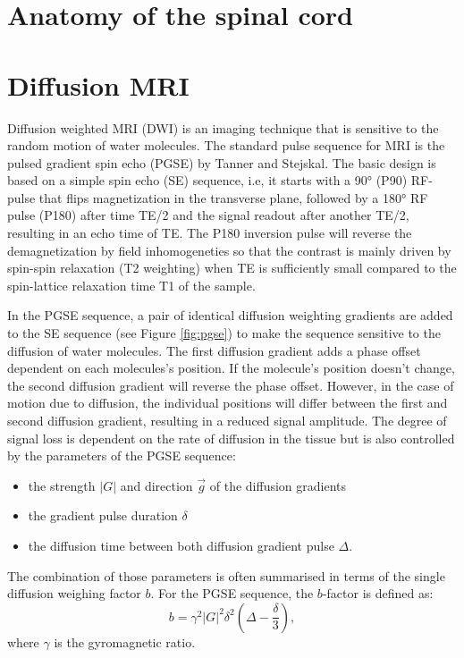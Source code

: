 \section{Anatomy of the spinal cord}
\section{Diffusion MRI}
Diffusion weighted MRI (DWI) is an imaging technique that is sensitive to the random motion of water molecules. The standard pulse sequence for MRI is the pulsed gradient spin echo (PGSE) by Tanner and Stejskal\cite{tanner65}. The basic design is based on a simple spin echo (SE) sequence, i.e, it starts with a 90° (P90) RF-pulse that flips magnetization in the transverse plane, followed by a 180° RF pulse (P180) after time TE/2 and the signal readout after another TE/2, resulting in an echo time of TE. The P180 inversion pulse will reverse the demagnetization by field inhomogeneties so that the contrast is mainly driven by spin-spin relaxation (T2 weighting) when TE is sufficiently small compared to the spin-lattice relaxation time T1 of the sample. 


In the PGSE sequence, a pair of identical diffusion weighting gradients are added to the SE sequence (see Figure \ref{fig:pgse}) to make the sequence sensitive to the diffusion of water molecules. The first diffusion gradient adds a phase offset dependent on each molecules's position. If the molecule's position doesn't change, the second diffusion gradient will reverse the phase offset. However, in the case of motion due to diffusion, the individual positions will differ between the first and second diffusion gradient, resulting in a reduced signal amplitude. The degree of signal loss is dependent on the rate of diffusion in the tissue but is also controlled by the parameters of the PGSE sequence:
\begin{itemize}
	\item the strength $|G|$ and direction $\vec{g}$ of the diffusion gradients
	\item the gradient pulse duration $\delta$
	\item the diffusion time between both diffusion gradient pulse $\Delta$.
\end{itemize}
The combination of those parameters is often summarised in terms of the single diffusion weighing factor $b$. For the PGSE sequence, the $b$-factor is defined as:
\begin{equation}
	b = \gamma^2|G|^2\delta^2(\Delta-\frac{\delta}{3}),
    \label{eq:bvalue}
\end{equation}
where $\gamma$ is the gyromagnetic ratio.            

